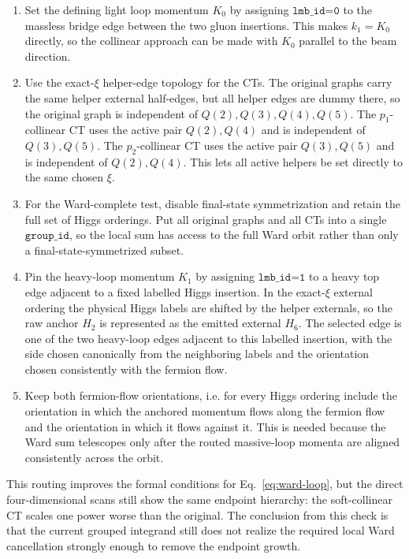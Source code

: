 \documentclass[11pt]{report}
\begin{document}
\begin{enumerate}
  \item Set the defining light loop momentum \(K_0\) by assigning
  \(\texttt{lmb\_id=0}\) to the massless bridge edge between the two gluon
  insertions. This makes \(k_1=K_0\) directly, so the collinear approach can
  be made with \(K_0\) parallel to the beam direction.

  \item Use the exact-\(\xi\) helper-edge topology for the CTs. The original
  graphs carry the same helper external half-edges, but all helper edges are
  dummy there, so the original graph is independent of \(Q(2),Q(3),Q(4),Q(5)\).
  The \(p_1\)-collinear CT uses the active pair \(Q(2),Q(4)\) and is
  independent of \(Q(3),Q(5)\). The \(p_2\)-collinear CT uses the active pair
  \(Q(3),Q(5)\) and is independent of \(Q(2),Q(4)\). This lets all active
  helpers be set directly to the same chosen \(\xi\).

  \item For the Ward-complete test, disable final-state symmetrization and
  retain the full set of Higgs orderings. Put all original graphs and all CTs
  into a single \(\texttt{group\_id}\), so the local sum has access to the full
  Ward orbit rather than only a final-state-symmetrized subset.

  \item Pin the heavy-loop momentum \(K_1\) by assigning \(\texttt{lmb\_id=1}\)
  to a heavy top edge adjacent to a fixed labelled Higgs insertion. In the
  exact-\(\xi\) external ordering the physical Higgs labels are shifted by the
  helper externals, so the raw anchor \(H_2\) is represented as the emitted
  external \(H_6\). The selected edge is one of the two heavy-loop edges
  adjacent to this labelled insertion, with the side chosen canonically from
  the neighboring labels and the orientation chosen consistently with the
  fermion flow.

  \item Keep both fermion-flow orientations, i.e. for every Higgs ordering
  include the orientation in which the anchored momentum flows along the
  fermion flow and the orientation in which it flows against it. This is
  needed because the Ward sum telescopes only after the routed massive-loop
  momenta are aligned consistently across the orbit.
\end{enumerate}

This routing improves the formal conditions for Eq.~\eqref{eq:ward-loop}, but
the direct four-dimensional scans still show the same endpoint hierarchy:
the soft-collinear CT scales one power worse than the original. The conclusion
from this check is that the current grouped integrand still does not realize
the required local Ward cancellation strongly enough to remove the endpoint
growth.
\end{document}
